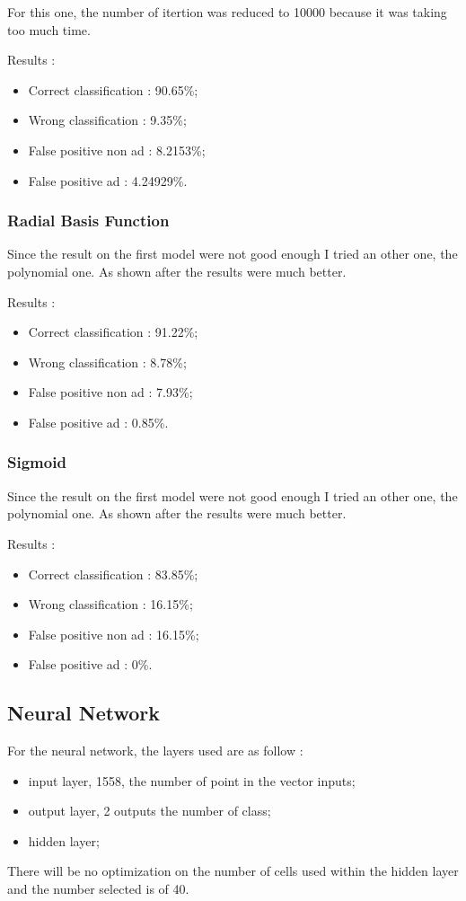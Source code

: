 For this one, the number of itertion was reduced to 10000 because it was taking too much time.

Results :
\begin{itemize}
  \item Correct classification : 90.65\%;
  \item Wrong classification : 9.35\%;
  \item False positive non ad : 8.2153\%;
  \item False positive ad : 4.24929\%.
\end{itemize}

\subsubsection{Radial Basis Function}

Since the result on the first model were not good enough I tried an other one, the polynomial one. As shown after the results were much better.

Results :
\begin{itemize}
  \item Correct classification : 91.22\%;
  \item Wrong classification : 8.78\%;
  \item False positive non ad : 7.93\%;
  \item False positive ad : 0.85\%.
\end{itemize}

\subsubsection{Sigmoid}

Since the result on the first model were not good enough I tried an other one, the polynomial one. As shown after the results were much better.

Results :
\begin{itemize}
  \item Correct classification : 83.85\%;
  \item Wrong classification : 16.15\%;
  \item False positive non ad : 16.15\%;
  \item False positive ad : 0\%.
\end{itemize}

\subsection{Neural Network}
For the neural network, the layers used are as follow :
  \begin{itemize}
    \item input layer, 1558, the number of point in the vector inputs;
    \item output layer, 2 outputs the number of class;
    \item hidden layer;
  \end{itemize}
  There will be no optimization on the number of cells used within the hidden layer and the number selected is of 40.

